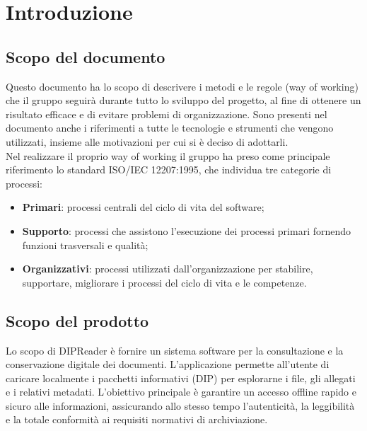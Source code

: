 \documentclass[a4paper,12pt]{article}
\begin{document}
\newpage

\tableofcontents
\newpage

\listoffigures
\newpage

\listoftables
\newpage

\section{Introduzione}
    \subsection{Scopo del documento}
        Questo documento ha lo scopo di descrivere i metodi e le regole (way of working) che il gruppo seguirà durante tutto lo sviluppo del progetto, al fine di ottenere un risultato efficace e di evitare problemi di organizzazione.
        Sono presenti nel documento anche i riferimenti a tutte le tecnologie e strumenti che vengono utilizzati, insieme alle motivazioni per cui si è deciso di adottarli.\\
        Nel realizzare il proprio way of working il gruppo ha preso come principale riferimento lo standard ISO/IEC 12207:1995, che individua tre categorie di processi:
        \begin{itemize}
            \item \textbf{Primari}: processi centrali del ciclo di vita del software;
            \item \textbf{Supporto}: processi che assistono l'esecuzione dei processi primari fornendo funzioni trasversali e qualità;
            \item \textbf{Organizzativi}: processi utilizzati dall'organizzazione per stabilire, supportare, migliorare i processi del ciclo di vita e le competenze.
        \end{itemize}

    \subsection{Scopo del prodotto}
        Lo scopo di DIPReader è fornire un sistema software per la consultazione e la conservazione digitale dei documenti. L'applicazione permette all'utente di caricare localmente i pacchetti informativi (DIP) per esplorarne i file, gli allegati e i relativi metadati. L'obiettivo principale è garantire un accesso offline rapido e sicuro alle informazioni, assicurando allo stesso tempo l'autenticità, la leggibilità e la totale conformità ai requisiti normativi di archiviazione.
\end{document}
